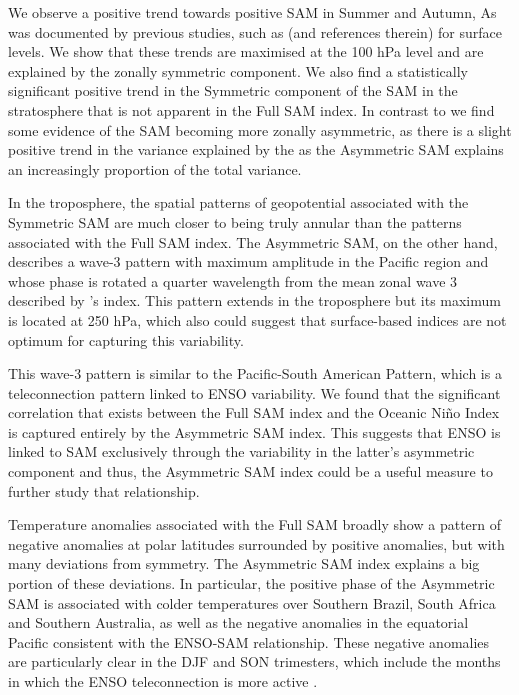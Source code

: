 \documentclass[smallextended]{svjour3}       %
\begin{document}
We observe a positive trend towards positive SAM in Summer and Autumn, As was documented by previous studies, such as \citet{fogt2020} (and references therein) for surface levels. We show that these trends are maximised at the 100 hPa level and are explained by the zonally symmetric component. We also find a statistically significant positive trend in the Symmetric component of the SAM in the stratosphere that is not apparent in the Full SAM index. In contrast to \citet{fogt2012} we find some evidence of the SAM becoming more zonally asymmetric, as there is a slight positive trend in the variance explained by the as the Asymmetric SAM explains an increasingly proportion of the total variance.

In the troposphere, the spatial patterns of geopotential associated with the Symmetric SAM are much closer to being truly annular than the patterns associated with the Full SAM index. The Asymmetric SAM, on the other hand, describes a wave-3 pattern with maximum amplitude in the Pacific region and whose phase is rotated a quarter wavelength from the mean zonal wave 3 described by \citet{raphael2004}'s index. This pattern extends in the troposphere but its maximum is located at 250 hPa, which also could suggest that surface-based indices are not optimum for capturing this variability.

This wave-3 pattern is similar to the Pacific-South American Pattern, which is a teleconnection pattern linked to ENSO variability. We found that the significant correlation that exists between the Full SAM index and the Oceanic Niño Index is captured entirely by the Asymmetric SAM index. This suggests that ENSO is linked to SAM exclusively through the variability in the latter's asymmetric component and thus, the Asymmetric SAM index could be a useful measure to further study that relationship.

Temperature anomalies associated with the Full SAM broadly show a pattern of negative anomalies at polar latitudes surrounded by positive anomalies, but with many deviations from symmetry. The Asymmetric SAM index explains a big portion of these deviations. In particular, the positive phase of the Asymmetric SAM is associated with colder temperatures over Southern Brazil, South Africa and Southern Australia, as well as the negative anomalies in the equatorial Pacific consistent with the ENSO-SAM relationship. These negative anomalies are particularly clear in the DJF and SON trimesters, which include the months in which the ENSO teleconnection is more active \citep{cazes-boezio2003, fogt2011, cai2020a}.
\end{document}
